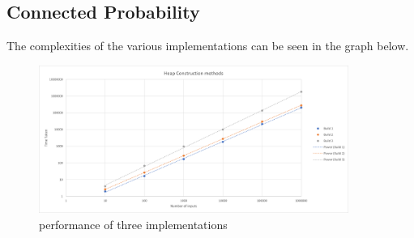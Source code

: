 \documentclass[12pt]{article}
\begin{document}
\subsection{Connected Probability}
The complexities of the various implementations can be seen in the graph below.
\begin{figure}[H]
\centering
\includegraphics[width=0.9\textwidth,height=\textheight,keepaspectratio]{heap}
\caption{performance of three implementations}
\label{Figure: m1}
\end{figure}
\end{document}
